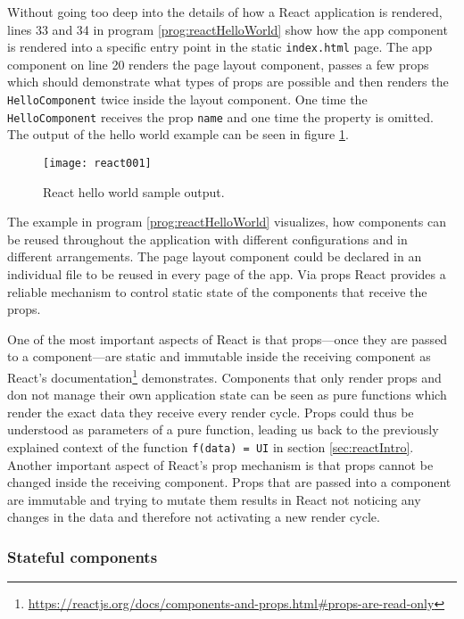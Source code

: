 Without going too deep into the details of how a React application is rendered, lines 33 and 34 in program \ref{prog:reactHelloWorld} show how the app component is rendered into a specific entry point in the static \texttt{index.html} page. The app component on line 20 renders the page layout component, passes a few props which should demonstrate what types of props are possible and then renders the \texttt{HelloComponent} twice inside the layout component. One time the \texttt{HelloComponent} receives the prop \texttt{name} and one time the property is omitted. The output of the hello world example can be seen in figure \ref{fig:reactHelloWorld}. 

\begin{figure}
  \centering
  \texttt{[image: react001]}
  \caption{React hello world sample output.}
  \label{fig:reactHelloWorld}
\end{figure}

The example in program \ref{prog:reactHelloWorld} visualizes, how components can be reused throughout the application with different configurations and in different arrangements. The page layout component could be declared in an individual file to be reused in every page of the app. Via props React provides a reliable mechanism to control static state of the components that receive the props.

One of the most important aspects of React is that props---once they are passed to a component---are static and immutable inside the receiving component as React's documentation\footnote{\url{https://reactjs.org/docs/components-and-props.html\#props-are-read-only}} demonstrates. Components that only render props and don not manage their own application state can be seen as pure functions which render the exact data they receive every render cycle. Props could thus be understood as parameters of a pure function, leading us back to the previously explained context of the function \texttt{f(data) = UI} in section \ref{sec:reactIntro}. Another important aspect of React's prop mechanism is that props cannot be changed inside the receiving component. Props that are passed into a component are immutable and trying to mutate them results in React not noticing any changes in the data and therefore not activating a new render cycle.

\subsubsection{Stateful components}

